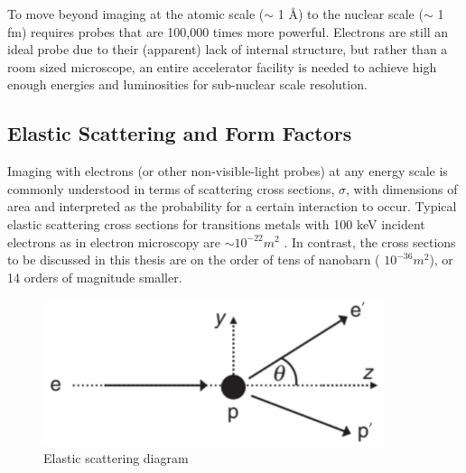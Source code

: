         To move beyond imaging at the atomic scale ($\sim$ 1 \AA) to the nuclear scale ($\sim$ 1 fm) requires probes that are 100,000 times more powerful. Electrons are still an ideal probe due to their (apparent) lack of internal structure, but rather than a room sized microscope, an entire accelerator facility is needed to achieve high enough energies and luminosities for sub-nuclear scale resolution. 
        


    \subsection{Elastic Scattering and Form Factors}

        Imaging with electrons (or other non-visible-light probes) at any energy scale is commonly understood in terms of scattering cross sections, $\sigma$, with dimensions of area and interpreted as the probability for a certain interaction to occur. Typical elastic scattering cross sections for transitions metals with 100 keV incident electrons as in electron microscopy are $\sim 10^{-22} m^2$ \cite{Williams2009TransmissionMicroscopy}. In contrast, the cross sections to be discussed in this thesis are on the order of tens of nanobarn ( $10^{-36} m^2$), or 14 orders of magnitude smaller. 
        

        \begin{figure}[H]
            \centering
            \includegraphics[width=10cm]{Chapters/Ch1-Intro/Ch1-Sec1-Background/pics/elastic-ep/kine-e-2.PNG}
            \caption{Elastic scattering diagram}
        \end{figure}
            

